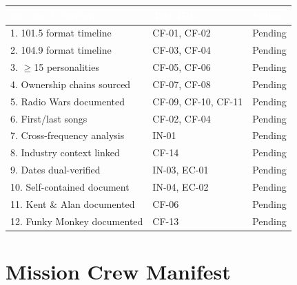 \documentclass[11pt,letterpaper]{article}
\newcommand{\tableheader}[1]{\textbf{\sffamily\textcolor{white}{#1}}}
\begin{document}
\begin{center}
\begin{tabularx}{\textwidth}{XL{3.5cm}C{1.5cm}}
\toprule
{}
\tableheader{Success Criterion} & \tableheader{Test ID(s)} & \tableheader{Status} \\
. 101.5 format timeline & CF-01, CF-02 & Pending \\
2. 104.9 format timeline & CF-03, CF-04 & Pending \\
3. $\geq$15 personalities & CF-05, CF-06 & Pending \\
4. Ownership chains sourced & CF-07, CF-08 & Pending \\
5. Radio Wars documented & CF-09, CF-10, CF-11 & Pending \\
6. First/last songs & CF-02, CF-04 & Pending \\
7. Cross-frequency analysis & IN-01 & Pending \\
8. Industry context linked & CF-14 & Pending \\
9. Dates dual-verified & IN-03, EC-01 & Pending \\
10. Self-contained document & IN-04, EC-02 & Pending \\
11. Kent \& Alan documented & CF-06 & Pending \\
12. Funky Monkey documented & CF-13 & Pending \\
\bottomrule
\end{tabularx}
\end{center}

\section{Mission Crew Manifest}
\end{document}
